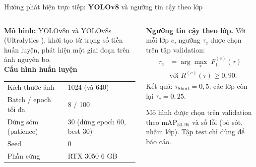 \documentclass[aspectratio=169,11pt,t]{beamer}
\newcommand{\hl}[1]{{\bfseries\color{coral}#1}}
\begin{document}
\begin{frame}{Hướng phát hiện trực tiếp: \hl{YOLOv8} và ngưỡng tin cậy theo lớp}
  \begin{columns}[T]
    \begin{column}{0.50\textwidth}
      \small
      \textbf{Mô hình:} YOLOv8n và YOLOv8s (Ultralytics \cite{r4}), khởi tạo từ trọng số tiền huấn luyện, phát hiện một giai đoạn trên ảnh nguyên bo.\\[4pt]
      \textbf{Cấu hình huấn luyện}
      \vspace{1pt}
      \footnotesize
      \renewcommand{\arraystretch}{1.2}\setlength{\tabcolsep}{4pt}
      \begin{tabular}{@{}L{3.0cm}L{3.2cm}@{}}
        \toprule
        Kích thước ảnh & 1024 (và 640) \\
        Batch / epoch tối đa & 8 / 100 \\
        Dừng sớm (patience) & 30 (dừng epoch 60, best 30) \\
        Seed & 0 \\
        Phần cứng & RTX 3050 6 GB \\
        \bottomrule
      \end{tabular}
    \end{column}
    \begin{column}{0.46\textwidth}
      \small
      \textbf{Ngưỡng tin cậy theo lớp.} Với mỗi lớp $c$, ngưỡng $\tau_c$ được chọn trên tập validation:
      \[
        \begin{aligned}
  \tau_c&=\arg\max_{\tau}\;F_1^{(c)}(\tau)\\
  &\text{với } R^{(c)}(\tau)\ge 0{,}90 .
\end{aligned}
      \]
      Kết quả: $\tau_{\text{Short}}=0{,}5$; các lớp còn lại $\tau_c=0{,}25$.\\[4pt]
      \begin{why}
        \footnotesize Mô hình được chọn trên validation theo $\mathrm{mAP}_{50\text{--}95}$ và số lỗi (bỏ sót, nhầm lớp). Tập test chỉ dùng để báo cáo.
      \end{why}
    \end{column}
  \end{columns}
\end{frame}
\end{document}
